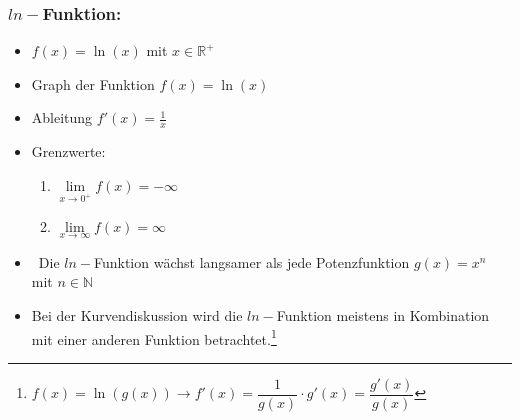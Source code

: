 \documentclass[a4paper,twocolumn,10pt]{onepgnote}
\renewcommand\mynote{\notebox{Hinweis:}\ }  %
\begin{document}
 \subsubsection{$ln-$Funktion:}
 \begin{itemize}
 \item $f(x) = \ln(x)$ mit $x\in \mathds{R}^+$
 \item Graph der Funktion $f(x)=\ln(x)$\\
\item Ableitung $f'(x) = \frac{1}{x}$
\item Grenzwerte:\\
\begin{enumerate}
\item $\lim \limits_{x\longrightarrow 0^+} f(x) = -\infty$\\
\item $\lim \limits_{x\longrightarrow \infty} f(x) = \infty$
\end{enumerate}
\item \mynote Die $ln-$Funktion wächst langsamer als jede Potenzfunktion $g(x)= x^n$ mit $n\in\mathds{N}$
\item Bei der Kurvendiskussion wird die $ln-$Funktion meistens in Kombination mit einer anderen Funktion betrachtet.\footnote{$f(x) = \ln{(g(x))}  \longrightarrow f'(x) = \dfrac{1}{ g(x)} \cdot g'(x) = \dfrac{g'(x)}{g(x)} $}
 \end{itemize}
\end{document}
